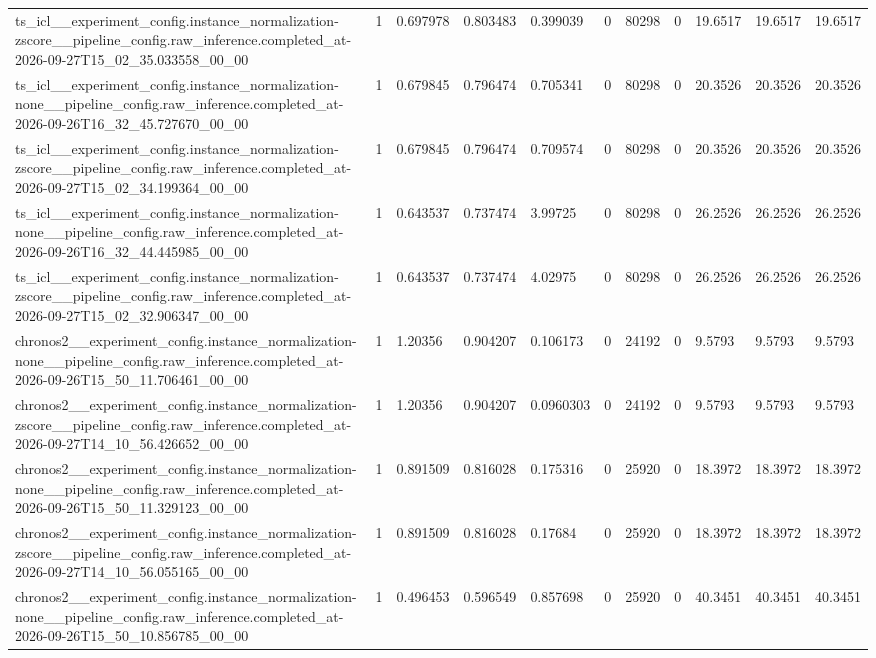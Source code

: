 \begin{tabular}{lllllllllll}
ts\_icl\_\_experiment\_config.instance\_normalization-zscore\_\_pipeline\_config.raw\_inference.completed\_at-2026-09-27T15\_02\_35.033558\_00\_00 & 1 & 0.697978 & 0.803483 & 0.399039 & 0 & 80298 & 0 & 19.6517 & 19.6517 & 19.6517 \\
ts\_icl\_\_experiment\_config.instance\_normalization-none\_\_pipeline\_config.raw\_inference.completed\_at-2026-09-26T16\_32\_45.727670\_00\_00 & 1 & 0.679845 & 0.796474 & 0.705341 & 0 & 80298 & 0 & 20.3526 & 20.3526 & 20.3526 \\
ts\_icl\_\_experiment\_config.instance\_normalization-zscore\_\_pipeline\_config.raw\_inference.completed\_at-2026-09-27T15\_02\_34.199364\_00\_00 & 1 & 0.679845 & 0.796474 & 0.709574 & 0 & 80298 & 0 & 20.3526 & 20.3526 & 20.3526 \\
ts\_icl\_\_experiment\_config.instance\_normalization-none\_\_pipeline\_config.raw\_inference.completed\_at-2026-09-26T16\_32\_44.445985\_00\_00 & 1 & 0.643537 & 0.737474 & 3.99725 & 0 & 80298 & 0 & 26.2526 & 26.2526 & 26.2526 \\
ts\_icl\_\_experiment\_config.instance\_normalization-zscore\_\_pipeline\_config.raw\_inference.completed\_at-2026-09-27T15\_02\_32.906347\_00\_00 & 1 & 0.643537 & 0.737474 & 4.02975 & 0 & 80298 & 0 & 26.2526 & 26.2526 & 26.2526 \\
chronos2\_\_experiment\_config.instance\_normalization-none\_\_pipeline\_config.raw\_inference.completed\_at-2026-09-26T15\_50\_11.706461\_00\_00 & 1 & 1.20356 & 0.904207 & 0.106173 & 0 & 24192 & 0 & 9.5793 & 9.5793 & 9.5793 \\
chronos2\_\_experiment\_config.instance\_normalization-zscore\_\_pipeline\_config.raw\_inference.completed\_at-2026-09-27T14\_10\_56.426652\_00\_00 & 1 & 1.20356 & 0.904207 & 0.0960303 & 0 & 24192 & 0 & 9.5793 & 9.5793 & 9.5793 \\
chronos2\_\_experiment\_config.instance\_normalization-none\_\_pipeline\_config.raw\_inference.completed\_at-2026-09-26T15\_50\_11.329123\_00\_00 & 1 & 0.891509 & 0.816028 & 0.175316 & 0 & 25920 & 0 & 18.3972 & 18.3972 & 18.3972 \\
chronos2\_\_experiment\_config.instance\_normalization-zscore\_\_pipeline\_config.raw\_inference.completed\_at-2026-09-27T14\_10\_56.055165\_00\_00 & 1 & 0.891509 & 0.816028 & 0.17684 & 0 & 25920 & 0 & 18.3972 & 18.3972 & 18.3972 \\
chronos2\_\_experiment\_config.instance\_normalization-none\_\_pipeline\_config.raw\_inference.completed\_at-2026-09-26T15\_50\_10.856785\_00\_00 & 1 & 0.496453 & 0.596549 & 0.857698 & 0 & 25920 & 0 & 40.3451 & 40.3451 & 40.3451 \\

\end{tabular}
